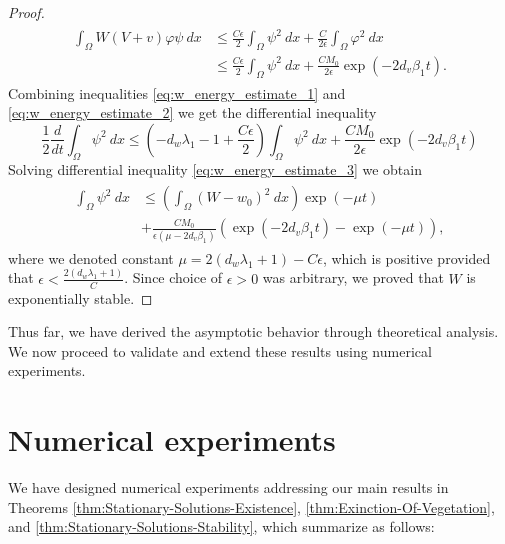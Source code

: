 \documentclass[preprint,12pt]{elsarticle}
\theoremstyle{plain}
\theoremstyle{definition}
\theoremstyle{remark}
\begin{document}
\begin{proof}
    \begin{align}
        \label{eq:w_energy_estimate_2}
        \begin{split}
            \int_\Omega W(V+v) \varphi \psi \:dx
            &\leq
            \frac{C \epsilon}{2}\int_\Omega \psi^2 \:dx + \frac{C}{2 \epsilon} \int_\Omega \varphi^2 \:dx 
            \\[6pt]
            &\leq
            \frac{C \epsilon}{2}\int_\Omega \psi^2 \:dx + \frac{C M_0}{2 \epsilon} \exp(-2d_v\beta_1 t).
        \end{split}
    \end{align}
    Combining inequalities \eqref{eq:w_energy_estimate_1} and \eqref{eq:w_energy_estimate_2} we get the differential inequality
    \begin{equation}
        \label{eq:w_energy_estimate_3}
        \frac{1}{2}\frac{d}{dt}\int_\Omega \psi^2 \:dx
        \leq
        \left( -d_w \lambda_1 - 1 + \frac{C\epsilon}{2} \right) \int_\Omega \psi^2\:dx + \frac{C M_0}{2\epsilon} \exp(-2d_v \beta_1 t)
    \end{equation}
    Solving differential inequality \eqref{eq:w_energy_estimate_3} we obtain
    \begin{align}
        \label{eq:w_energy_estimate_4}
        \begin{split}
            \int_\Omega \psi^2 \:dx 
            &\leq
            \left( \int_\Omega (W-w_0)^2 \:dx \right) \exp(-\mu t) 
            \\[6pt]
            &+
            \frac{C M_0}{\epsilon (\mu - 2d_v \beta_1)} \left( \exp(-2d_v \beta_1 t) - \exp(-\mu t) \right),
        \end{split}
    \end{align}
    where we denoted constant $\mu = 2(d_w\lambda_1 + 1) - C\epsilon$, which is positive provided that $\epsilon < \frac{2(d_w \lambda_1 + 1)}{C}$. Since choice of $\epsilon > 0$ was arbitrary, we proved that $W$ is exponentially stable.
\end{proof}

Thus far, we have derived the asymptotic behavior through theoretical analysis. We now proceed to validate and extend these results using numerical experiments.

\section{Numerical experiments}
We have designed numerical experiments addressing our main results in Theorems \ref{thm:Stationary-Solutions-Existence}, \ref{thm:Exinction-Of-Vegetation}, and \ref{thm:Stationary-Solutions-Stability}, which summarize as follows: 
\end{document}
